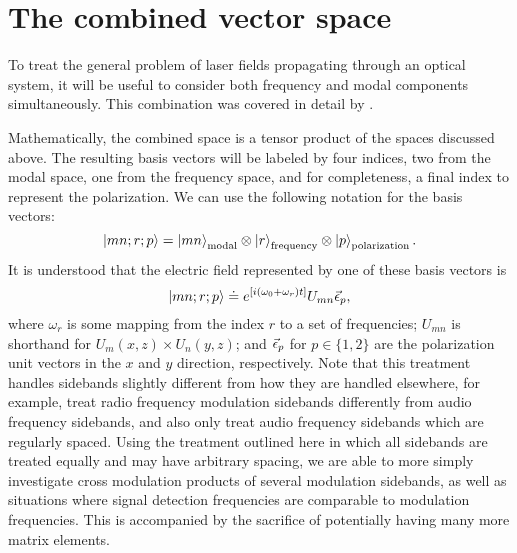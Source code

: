 \section{The combined vector space}
To treat the general problem of laser fields propagating through an optical system, it will be useful to consider both frequency and modal components simultaneously. %
This combination was covered in detail by \citet{Sigg:00}.

Mathematically, the combined space is a tensor product of the spaces discussed above. %
The resulting basis vectors will be labeled by four indices, two from the modal space, one from the frequency space, and for completeness, a final index to represent the polarization. %
We can use the following notation for the basis vectors:
\begin{equation}
\left| mn;r;p \right>=\left| mn \right>_{\text{modal}}\otimes\left| r \right>_{\text{frequency}}\otimes\left| p \right>_{\text{polarization}}.
\end{equation}
It is understood that the electric field represented by one of these basis vectors is
\[
\left| mn;r;p \right> \doteq e^{\left[ i\left( \omega_0+\omega_r\right)t\right]} U_{mn}\vec{\epsilon}_p,
\]
where $\omega_r$ is some mapping from the index $r$ to a set of frequencies; $U_{mn}$ is shorthand for $U_m(x,z)\times U_n(y,z)$; and $\vec{\epsilon}_p$ for $p\in \{1,2\}$ are the polarization unit vectors in the $x$ and $y$ direction, respectively. %
Note that this treatment handles sidebands slightly different from how they are handled elsewhere, for example, \citet{Sigg:00} treat radio frequency modulation sidebands differently from audio frequency sidebands, and also only treat audio frequency sidebands which are regularly spaced. %
Using the treatment outlined here in which all sidebands are treated equally and may have arbitrary spacing, we are able to more simply investigate cross modulation products of several modulation sidebands, as well as situations where signal detection frequencies are comparable to modulation frequencies. %
This is accompanied by the sacrifice of potentially having many more matrix elements.

